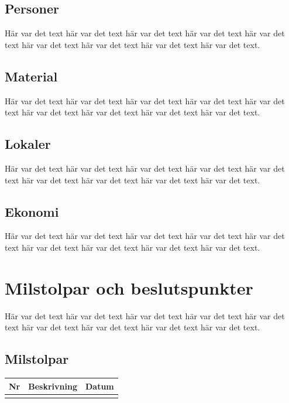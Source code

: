 \documentclass[a4paper,titlepage,12pt]{article}
\newcounter{milNr}
\newcommand{\nextMilNr}{\stepcounter{milNr}\arabic{milNr}}
\begin{document}
	
	\subsection{Personer}
	Här var det text här var det text här var det text
	här var det text här var det text här var det text
	här var det text här var det text här var det text.
	
	
	\subsection{Material}
	Här var det text här var det text här var det text
	här var det text här var det text här var det text
	här var det text här var det text här var det text.
	
	
	\subsection{Lokaler}
	Här var det text här var det text här var det text
	här var det text här var det text här var det text
	här var det text här var det text här var det text.
	
	
	\subsection{Ekonomi}
	Här var det text här var det text här var det text
	här var det text här var det text här var det text
	här var det text här var det text här var det text.
	
	
	\section{Milstolpar och beslutspunkter}
	Här var det text här var det text här var det text
	här var det text här var det text här var det text
	här var det text här var det text här var det text.
	
	
	\subsection{Milstolpar}
	\begin{table}[h]
		\begin{center}
			\begin{tabular}[pos]{ l l l }
				\textbf{Nr} & \textbf{Beskrivning} & \textbf{Datum} \\ \midrule
				\nextMilNr{} & & \\ \midrule
			\end{tabular}
		\end{center}
	\end{table}
	
\end{document}
